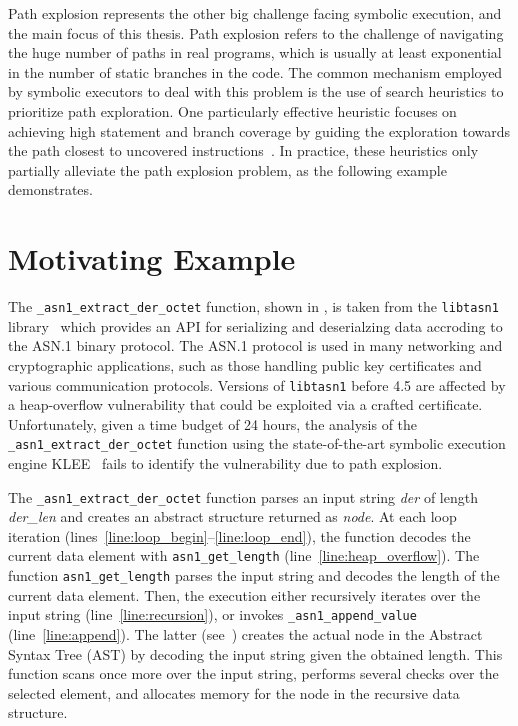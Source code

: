 Path explosion represents the other big challenge facing symbolic execution,
and the main focus of this thesis.
Path explosion refers to the challenge of navigating the huge number of paths in real programs,
which is usually at least exponential in the number of static branches in the code.
The common mechanism employed by symbolic executors to
deal with this problem is the use of search heuristics to prioritize path exploration.
One particularly effective heuristic focuses on
achieving high statement and branch coverage by guiding the
exploration towards the path closest to uncovered
instructions~\cite{exe,klee,sen:concolicheuristics,fitsymex:dsn09}.
In practice, these heuristics only partially alleviate the path
explosion problem, as the following example demonstrates.

\section{Motivating Example}
The \texttt{\_asn1\_extract\_der\_octet} function, shown in ,
is taken from the \texttt{libtasn1} library~\cite{libtasn1}
which provides an API for serializing and deserialzing data accroding to the ASN.1 binary protocol.
The ASN.1 protocol is used in many networking and
cryptographic applications, such as those handling public key
certificates and various communication protocols.
Versions of \texttt{libtasn1} before 4.5 are affected by a heap-overflow 
vulnerability \cite{CVE-2015-3622} that could be exploited via a crafted certificate.
Unfortunately, given a time budget of 24 hours,
the analysis of the \texttt{\_asn1\_extract\_der\_octet} function using
the state-of-the-art symbolic execution engine KLEE~\cite{klee} fails
to identify the vulnerability due to path explosion.

The \texttt{\_asn1\_extract\_der\_octet} function parses an input string \textit{der}
of length \textit{der\_len} and creates an abstract structure returned as \textit{node}.
At each loop iteration (lines~\ref{line:loop_begin}--\ref{line:loop_end}),
the function decodes the current data element with \texttt{asn1\_get\_length} (line~\ref{line:heap_overflow}).
The function \texttt{asn1\_get\_length} parses the input string and decodes the length of the current data element.
Then, the execution either recursively iterates over the input string (line~\ref{line:recursion}),
or invokes \texttt{\_asn1\_append\_value} (line~\ref{line:append}).
The latter (see~) creates the
actual node in the Abstract Syntax Tree (AST) by decoding the input
string given the obtained length. This function scans once more over
the input string, performs several checks over the selected element,
and allocates memory for the node in the recursive data structure.


